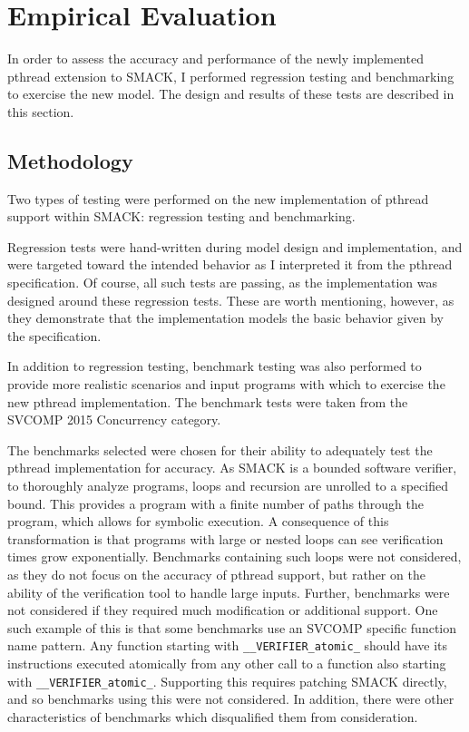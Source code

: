 \chapter{Empirical Evaluation}\label{ch:evaluation}
In order to assess the accuracy and performance of the newly
implemented pthread extension to SMACK, I performed regression testing
and benchmarking to exercise the new model.  The design and results of
these tests are described in this section.

\section{Methodology}\label{sec:methodology}
Two types of testing were performed on the new implementation of
pthread support within SMACK: regression testing and benchmarking.

Regression tests were hand-written during model design and
implementation, and were targeted toward the intended behavior as I
interpreted it from the pthread specification.  Of course, all such
tests are passing, as the implementation was designed around these
regression tests.  These are worth mentioning, however, as they
demonstrate that the implementation models the basic behavior given by
the specification. 

In addition to regression testing, benchmark testing was also
performed to provide more realistic scenarios and input programs with
which to exercise the new pthread implementation.  The benchmark tests
were taken from the SVCOMP 2015 Concurrency category.  

The benchmarks selected were chosen for their ability to adequately
test the pthread implementation for accuracy. As SMACK is a bounded
software verifier, to thoroughly analyze programs, loops and recursion
are unrolled to a specified bound.  This provides a program with a
finite number of paths through the program, which allows for symbolic
execution.  A consequence of this transformation is that programs with
large or nested loops can see verification times grow 
exponentially. Benchmarks containing such loops were not
considered, as they do not focus on the accuracy of pthread support,
but rather on the ability of the verification tool to handle large
inputs.  Further, benchmarks were not considered if they required much
modification or additional support.  One such example of this is that
some benchmarks use an SVCOMP specific function name pattern.  Any
function starting with \lstinline|__VERIFIER_atomic_| should have its
instructions executed atomically from any other call to a function
also starting with \lstinline|__VERIFIER_atomic_|.  Supporting this
requires patching SMACK directly, and so benchmarks using this were
not considered.  In addition, there were other characteristics of
benchmarks which disqualified them from consideration.

